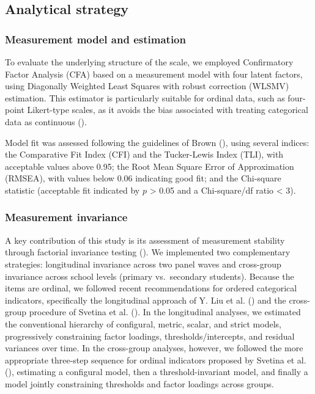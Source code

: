 \documentclass[
  13pt,
]{article}
\begin{document}
\subsection{Analytical strategy}\label{analytical-strategy}

\subsubsection{Measurement model and
estimation}\label{measurement-model-and-estimation}

To evaluate the underlying structure of the scale, we employed
Confirmatory Factor Analysis (CFA) based on a measurement model with
four latent factors, using Diagonally Weighted Least Squares with robust
correction (WLSMV) estimation. This estimator is particularly suitable
for ordinal data, such as four-point Likert-type scales, as it avoids
the bias associated with treating categorical data as continuous
().

Model fit was assessed following the guidelines of Brown
(), using several indices:
the Comparative Fit Index (CFI) and the Tucker-Lewis Index (TLI), with
acceptable values above 0.95; the Root Mean Square Error of
Approximation (RMSEA), with values below 0.06 indicating good fit; and
the Chi-square statistic (acceptable fit indicated by \(p\)
\textgreater{} 0.05 and a Chi-square/df ratio \textless{} 3).

\subsubsection{Measurement invariance}\label{measurement-invariance}

A key contribution of this study is its assessment of measurement
stability through factorial invariance testing
().
We implemented two complementary strategies: longitudinal invariance
across two panel waves and cross-group invariance across school levels
(primary vs.~secondary students). Because the items are ordinal, we
followed recent recommendations for ordered categorical indicators,
specifically the longitudinal approach of Y. Liu et al.
() and the cross-group procedure of
Svetina et al. (). In the
longitudinal analyses, we estimated the conventional hierarchy of
configural, metric, scalar, and strict models, progressively
constraining factor loadings, thresholds/intercepts, and residual
variances over time. In the cross-group analyses, however, we followed
the more appropriate three-step sequence for ordinal indicators proposed
by Svetina et al. (),
estimating a configural model, then a threshold-invariant model, and
finally a model jointly constraining thresholds and factor loadings
across groups.
\end{document}
